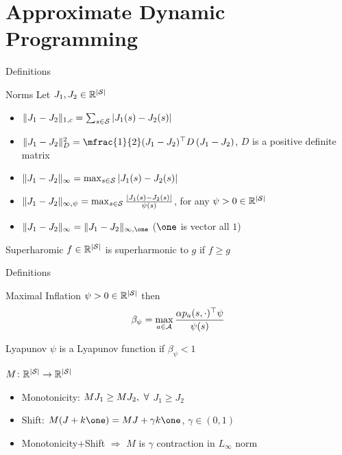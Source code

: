 \documentclass[10pt,handout]{beamer}
\begin{document}
\section{Approximate Dynamic Programming}


\begin{frame}[fragile]{Definitions}
\begin{block}{Norms}
Let $J_1,J_2\in \mathbb{R}^{|\mathcal{S}|}$
\begin{itemize}
\item $\|J_1-J_2\|_{1,c}=\sum_{s\in \mathcal{S}} \left|J_1(s)-J_2(s)\right|$
\item $\norm{J_1-J_2}^2_{D}=\mfrac{1}{2}(J_1-J_2)^\top D \,(J_1-J_2)$, $D$ is a positive definite matrix
\item $\|J_1-J_2\|_\infty=\max_{s\in \mathcal{S}}\left|J_1(s)-J_2(s)\right|$
\item $\|J_1-J_2\|_{\infty,\psi}=\max_{s\in \mathcal{S}}\frac{\left|J_1(s)-J_2(s)\right|}{\psi(s)}$, for any $\psi>0 \in \mathbb{R}^{|\mathcal{S}|}$
\item $\norm{J_1-J_2}_{\infty}=\norm{J_1-J_2}_{\infty,\one}$ ($\one$ is vector all $1$)
\end{itemize}
\end{block}


\begin{block}{Superharomic}
$f\in \mathbb{R}^{|\mathcal{S}|}$ is superharmonic to $g$ if $f\geq g$
\end{block}
\end{frame}

\begin{frame}[fragile]{Definitions}
\begin{block}{Maximal Inflation}
$\psi>0\in \mathbb{R}^{|\mathcal{S}|}$ then
\begin{align*}
\beta_\psi=\max_{a\in \mathcal{A}}\frac{\alpha p_a(s,\cdot)^\top \psi}{\psi(s)}
\end{align*}
\end{block}
\begin{block}{Lyapunov}
$\psi$ is a Lyapunov function if $\beta_\psi<1$
\end{block}

\begin{block}{$M\colon \mathbb{R}^{|\mathcal{S}|}\rightarrow\mathbb{R}^{|\mathcal{S}|}$}
\begin{itemize}
\item {Monotonicity:} $M J_1\geq M J_2, \mbox{ } \forall$ $J_1\geq J_2$
\item {Shift:} $M (J+k\one)= M J+\gamma k\one$, $\gamma \in (0,1)$
\item Monotonicity+Shift $\Rightarrow$ $M$ is $\gamma$ contraction in $L_\infty$ norm
\end{itemize}
\end{block}

\end{frame}
\end{document}
